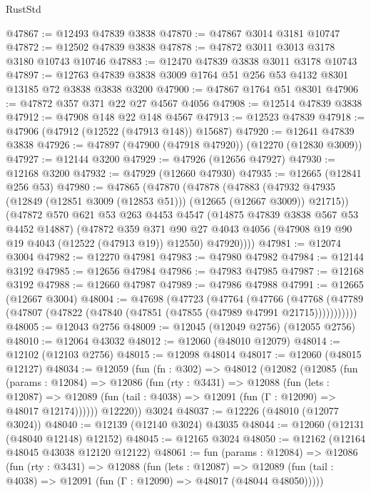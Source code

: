 \begin{lexlean}{RustStd}
\begin{coremodule}
@47867 := @12493 @47839 @3838
@47870 := @47867 @3014 @3181 @10747
@47872 := @12502 @47839 @3838
@47878 := @47872 @3011 @3013 @3178 @3180 @10743 @10746
@47883 := @12470 @47839 @3838 @3011 @3178 @10743
@47897 := @12763 @47839 @3838 @3009 @1764 @51 @256 @53 @4132 @8301 @13185 @72 @3838 @3838 @3200
@47900 := @47867 @1764 @51 @8301
@47906 := @47872 @357 @371 @22 @27 @4567 @4056
@47908 := @12514 @47839 @3838
@47912 := @47908 @148 @22 @148 @4567
@47913 := @12523 @47839
@47918 := @47906 (@47912 (@12522 (@47913 @148)) @15687)
@47920 := @12641 @47839 @3838
@47926 := @47897 (@47900 (@47918 @47920)) (@12270 (@12830 @3009))
@47927 := @12144 @3200
@47929 := @47926 (@12656 @47927)
@47930 := @12168 @3200
@47932 := @47929 (@12660 @47930)
@47935 := @12665 (@12841 @256 @53)
@47980 := @47865
    (@47870
      (@47878
        (@47883 (@47932 @47935 (@12849 (@12851 @3009 (@12853 @51))) (@12665 (@12667 @3009)) @21715))
        (@47872
          @570
          @621
          @53
          @263
          @4453
          @4547
          (@14875 @47839 @3838 @567 @53 @4452 @14887)
          (@47872
            @359
            @371
            @90
            @27
            @4043
            @4056
            (@47908 @19 @90 @19 @4043 (@12522 (@47913 @19)) @12550)
            @47920))))
@47981 := @12074 @3004
@47982 := @12270 @47981
@47983 := @47980 @47982
@47984 := @12144 @3192
@47985 := @12656 @47984
@47986 := @47983 @47985
@47987 := @12168 @3192
@47988 := @12660 @47987
@47989 := @47986 @47988
@47991 := @12665 (@12667 @3004)
@48004 := @47698
    (@47723
      (@47764
        (@47766
          (@47768 (@47789 (@47807 (@47822 (@47840 (@47851 (@47855 (@47989 @47991 @21715)))))))))))
@48005 := @12043 @2756
@48009 := @12045 (@12049 @2756) (@12055 @2756)
@48010 := @12064 @43032
@48012 := @12060 (@48010 @12079)
@48014 := @12102 (@12103 @2756)
@48015 := @12098 @48014
@48017 := @12060 (@48015 @12127)
@48034 := @12059
    (fun (fn : @302) =>
    @48012
      (@12082
        (@12085
          (fun (params : @12084) =>
          @12086
            (fun (rty : @3431) =>
            @12088
              (fun (lets : @12087) =>
              @12089 (fun (tail : @4038) => @12091 (fun (Γ : @12090) => @48017 @12174))))))
        @12220))
    @3024
@48037 := @12226 (@48010 (@12077 @3024))
@48040 := @12139 (@12140 @3024) @43035
@48044 := @12060 (@12131 (@48040 @12148) @12152)
@48045 := @12165 @3024
@48050 := @12162 (@12164 @48045 @43038 @12120 @12122)
@48061 := fun (params : @12084) =>
  @12086
    (fun (rty : @3431) =>
    @12088
      (fun (lets : @12087) =>
      @12089 (fun (tail : @4038) => @12091 (fun (Γ : @12090) => @48017 (@48044 @48050)))))

\end{coremodule}
\end{lexlean}
